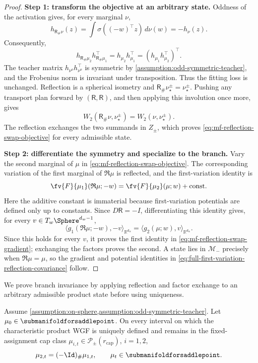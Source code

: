 \begin{proof}
\noindent\textbf{Step 1: transform the objective at an arbitrary state.}
Oddness of the activation gives, for every marginal \(\nu\),
\[
 h_{\mathsf R_\#\nu}(z)
 =\int\sigma((-w)^\top z)\,d\nu(w)=-h_\nu(z).
\]
Consequently,
\[
 h_{\mathsf R_\#\mu_2}h_{\mathsf R_\#\mu_1}^\top
 =h_{\mu_2}h_{\mu_1}^\top
 =(h_{\mu_1}h_{\mu_2}^\top)^\top.
\]
The teacher matrix \(h_{\nu^o}h_{\nu^o}^\top\) is symmetric by
\cref{assumption:odd-symmetric-teacher}, and the Frobenius norm is invariant
under transposition.  Thus the fitting loss is unchanged.  Reflection is a
spherical isometry and \(\mathsf R_\#\nu_\star^\pm=\nu_\star^\pm\).  Pushing
any transport plan forward by \((\mathsf R,\mathsf R)\), and then applying
this involution once more, gives
\[
 W_2(\mathsf R_\#\nu,\nu_\star^\pm)=W_2(\nu,\nu_\star^\pm).
\]
The reflection exchanges the two summands in \(Z_\pm\), which proves
\cref{eq:mf-reflection-swap-objective} for every admissible state.

\par\noindent\textbf{Step 2: differentiate the symmetry and specialize to the branch.}
Vary the second marginal of \(\mu\) in
\cref{eq:mf-reflection-swap-objective}.  The corresponding variation of the
first marginal of \(\mathfrak R\mu\) is reflected, and
the first-variation identity is
\[
 \fv{F}{\mu_1}(\mathfrak R\mu;-w)
 =\fv{F}{\mu_2}(\mu;w)+\mathrm{const}.
\]
Here the additive constant is immaterial because first-variation potentials
are defined only up to constants.  Since \(D\mathsf R=-I\), differentiating
this identity gives, for every \(v\in T_w\Sphere^{d_w-1}\),
\[
 \langle g_1(\mathfrak R\mu;-w),-v\rangle_{\mathbb R^{d_w}}
 =\langle g_2(\mu;w),v\rangle_{\mathbb R^{d_w}}.
\]
Since this holds for every \(v\), it proves the first identity in
\cref{eq:mf-reflection-swap-gradient}; exchanging the factors proves the
second.  A state lies in \(\mathcal M_-\) precisely when
\(\mathfrak R\mu=\mu\), so the gradient and potential identities in
\cref{eq:full-first-variation-reflection-covariance} follow.
\end{proof}

We prove branch invariance by applying reflection and factor exchange
to an arbitrary admissible product state before using uniqueness.
\begin{proposition}
\label{lem:invariance-antisymmetric-branch}
Assume \cref{assumption:on-sphere,assumption:odd-symmetric-teacher}.
Let \(\mu_0\in\submanifoldforsaddlepoint\). On every interval on which
the characteristic product WGF is uniquely defined and remains in the
fixed-assignment cap class \(\mu_{i,t}\in\mathcal P_\pm(r_{\mathrm{cap}})\), \(i=1,2\),
\[
 \mu_{2,t}=(-\Id)_\#\mu_{1,t},
 \qquad \mu_t\in\submanifoldforsaddlepoint.
\]
\end{proposition}


